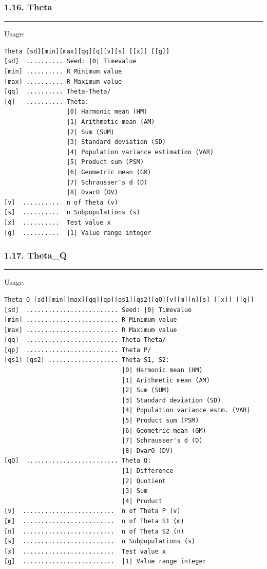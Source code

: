 \documentclass[
]{article}
\begin{document}
\hypertarget{theta}{%
\subsubsection{1.16. Theta}\label{theta}}

\begin{center}\rule{0.5\linewidth}{0.5pt}\end{center}

Usage:

\begin{verbatim}
Theta [sd][min][max][qq][q][v][s] [[x]] [[g]]
[sd]  .......... Seed: |0| Timevalue
[min] .......... R Minimum value
[max] .......... R Maximum value
[qq]  .......... Theta-Theta/
[q]   .......... Theta:
                 |0| Harmonic mean (HM)
                 |1| Arithmetic mean (AM)
                 |2| Sum (SUM)
                 |3| Standard deviation (SD)
                 |4| Population variance estimation (VAR)
                 |5| Product sum (PSM)
                 |6| Geometric mean (GM)
                 |7| Schrausser's d (D)
                 |8| DvarO (DV)
[v]  ..........  n of Theta (v)
[s]  ..........  n Subpopulations (s)
[x]  ..........  Test value x
[g]  ..........  |1| Value range integer
\end{verbatim}

\hypertarget{theta_q}{%
\subsubsection{1.17. Theta\_Q}\label{theta_q}}

\begin{center}\rule{0.5\linewidth}{0.5pt}\end{center}

Usage:

\begin{verbatim}
Theta_Q [sd][min][max][qq][qp][qs1][qs2][qQ][v][m][n][s] [[x]] [[g]]
[sd]  ......................... Seed: |0| Timevalue
[min] ......................... R Minimum value
[max] ......................... R Maximum value
[qq]  ......................... Theta-Theta/
[qp]  ......................... Theta P/
[qs1] [qs2] ................... Theta S1, S2:
                                |0| Harmonic mean (HM)
                                |1| Arithmetic mean (AM)
                                |2| Sum (SUM)
                                |3| Standard deviation (SD)
                                |4| Population variance estm. (VAR)
                                |5| Product sum (PSM)
                                |6| Geometric mean (GM)
                                |7| Schrausser's d (D)
                                |8| DvarO (DV)
[qQ]  ......................... Theta Q:
                                |1| Difference
                                |2| Quotient
                                |3| Sum
                                |4| Product
[v]  .........................  n of Theta P (v)
[m]  .........................  n of Theta S1 (m)
[n]  .........................  n of Theta S2 (n)
[s]  .........................  n Subpopulations (s)
[x]  .........................  Test value x
[g]  .........................  |1| Value range integer
\end{verbatim}
\end{document}
